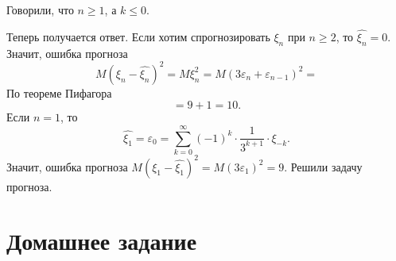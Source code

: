 Говорили, что $n \geq 1$, а $k \leq 0$.

Теперь получается ответ.
Если хотим спрогнозировать $ \xi_n$ при $n \geq 2$, то $ \hat{ \xi_n} = 0$.
Значит, ошибка прогноза
\begin{equation*}
  M \left( \xi_n - \hat{ \xi_n} \right)^2 =
  M \xi_n^2 =
  M \left( 3 \varepsilon_n + \varepsilon_{n - 1} \right)^2 =
\end{equation*}
По теореме Пифагора
\begin{equation*}
  = 9 + 1 =
  10.
\end{equation*}
Если $n = 1$, то
\begin{equation*}
  \hat{ \xi_1} =
  \varepsilon_0 =
  \sum \limits_{k = 0}^{ \infty } \left( -1 \right)^k \cdot \frac{1}{3^{k + 1}} \cdot \xi_{-k}.
\end{equation*}
Значит,
ошибка прогноза $M \left( \xi_1 - \hat{ \xi_1} \right)^2 = M \left( 3 \varepsilon_1 \right)^2 = 9$.
Решили задачу прогноза.

\section*{Домашнее задание}
